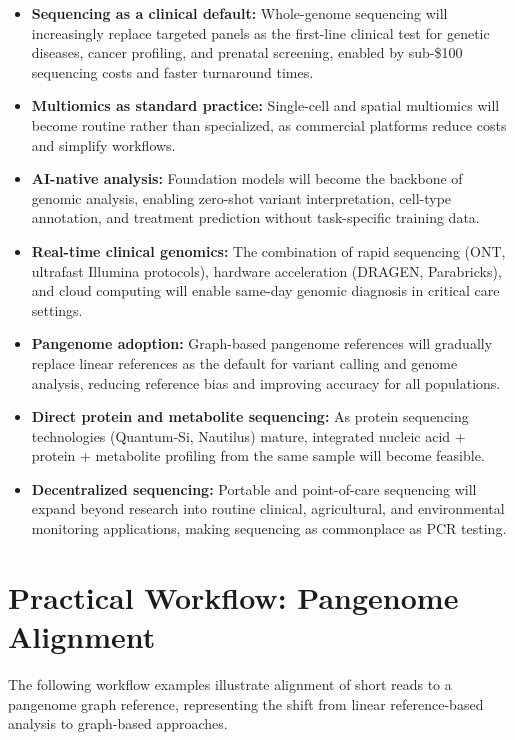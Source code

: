 \begin{itemize}[itemsep=3pt]
  \item \textbf{Sequencing as a clinical default:} Whole-genome sequencing will increasingly replace targeted panels as the first-line clinical test for genetic diseases, cancer profiling, and prenatal screening, enabled by sub-\$100 sequencing costs and faster turnaround times.
  \item \textbf{Multiomics as standard practice:} Single-cell and spatial multiomics will become routine rather than specialized, as commercial platforms reduce costs and simplify workflows.
  \item \textbf{AI-native analysis:} Foundation models will become the backbone of genomic analysis, enabling zero-shot variant interpretation, cell-type annotation, and treatment prediction without task-specific training data.
  \item \textbf{Real-time clinical genomics:} The combination of rapid sequencing (ONT, ultrafast Illumina protocols), hardware acceleration (DRAGEN, Parabricks), and cloud computing will enable same-day genomic diagnosis in critical care settings.
  \item \textbf{Pangenome adoption:} Graph-based pangenome references will gradually replace linear references as the default for variant calling and genome analysis, reducing reference bias and improving accuracy for all populations.
  \item \textbf{Direct protein and metabolite sequencing:} As protein sequencing technologies (Quantum-Si, Nautilus) mature, integrated nucleic acid + protein + metabolite profiling from the same sample will become feasible.
  \item \textbf{Decentralized sequencing:} Portable and point-of-care sequencing will expand beyond research into routine clinical, agricultural, and environmental monitoring applications, making sequencing as commonplace as PCR testing.
\end{itemize}


\section{Practical Workflow: Pangenome Alignment}
\label{sec:emerging:pangenome-workflow}

The following workflow examples illustrate alignment of short reads to a pangenome graph reference, representing the shift from linear reference-based analysis to graph-based approaches.

